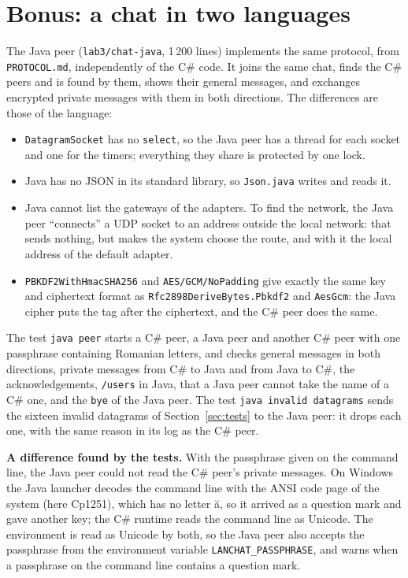 \documentclass[11pt,a4paper]{article}
\newcommand{\notebox}[1]{\par\smallskip\noindent\colorbox{notebg}{\parbox{\dimexpr\linewidth-2\fboxsep}{\small #1}}\par\smallskip}
\newcommand{\code}[1]{{\frenchspacing\texttt{#1}}}
\begin{document}
\section{Bonus: a chat in two languages}

The Java peer (\code{lab3/chat-java}, 1\,200 lines) implements the same protocol, from
\code{PROTOCOL.md}, independently of the C\# code. It joins the same chat, finds the C\# peers and is
found by them, shows their general messages, and exchanges encrypted private messages with them in
both directions. The differences are those of the language:

\begin{itemize}
  \item \code{DatagramSocket} has no \code{select}, so the Java peer has a thread for each socket and
        one for the timers; everything they share is protected by one lock.
  \item Java has no JSON in its standard library, so \code{Json.java} writes and reads it.
  \item Java cannot list the gateways of the adapters. To find the network, the Java peer
        ``connects'' a UDP socket to an address outside the local network: that sends nothing, but
        makes the system choose the route, and with it the local address of the default adapter.
  \item \code{PBKDF2WithHmacSHA256} and \code{AES/GCM/NoPadding} give exactly the same key and
        ciphertext format as \code{Rfc2898DeriveBytes.Pbkdf2} and \code{AesGcm}: the Java cipher puts
        the tag after the ciphertext, and the C\# peer does the same.
\end{itemize}

The test \code{java peer} starts a C\# peer, a Java peer and another C\# peer with one passphrase
containing Romanian letters, and checks general messages in both directions, private messages from
C\# to Java and from Java to C\#, the acknowledgements, \code{/users} in Java, that a Java peer cannot
take the name of a C\# one, and the \code{bye} of the Java peer. The test \code{java invalid
datagrams} sends the sixteen invalid datagrams of Section~\ref{sec:tests} to the Java peer: it drops
each one, with the same reason in its log as the C\# peer.

\notebox{\textbf{A difference found by the tests.} With the passphrase given on the command line, the
Java peer could not read the C\# peer's private messages. On Windows the Java launcher decodes the
command line with the ANSI code page of the system (here Cp1251), which has no letter \u{a}, so it
arrived as a question mark and gave another key; the C\# runtime reads the command line as Unicode.
The environment is read as Unicode by both, so the Java peer also accepts the passphrase from the
environment variable \code{LANCHAT\_PASSPHRASE}, and warns when a passphrase on the command line
contains a question mark.}
\end{document}
